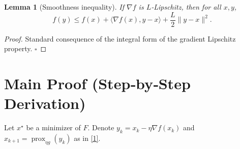 \documentclass{article}
\newtheorem{lemma}{Lemma}
\newcommand{\prox}{\operatorname{prox}}
\newcommand{\grad}{\nabla}
\begin{document}
\begin{lemma}[Smoothness inequality]\label{lem:smooth}
If $\grad f$ is $L$‑Lipschitz, then for all $x,y$,
\[
f(y)\le f(x)+\langle\grad f(x),y-x\rangle+\frac{L}{2}\|y-x\|^{2}.
\tag{7}
\]
\end{lemma}
\begin{proof}
Standard consequence of the integral form of the gradient Lipschitz property. $\square$
\end{proof}

\newpage
\section*{Main Proof (Step‑by‑Step Derivation)}
Let $x^{\star}$ be a minimizer of $F$.  
Denote $y_{k}=x_{k}-\eta\grad f(x_{k})$ and $x_{k+1}=\prox_{\eta g}(y_{k})$ as in \eqref{1}.
\end{document}
